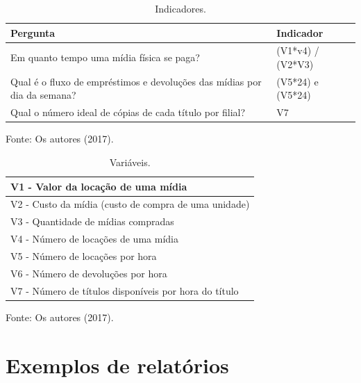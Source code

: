 \begin{table}[!htb]
    \begin{center}
        \caption{Indicadores.} \label{tab:indi}
        \begin{tabular}{ p{4.5cm} |  p{4.5cm}   }
            \hline
            \textbf{Pergunta} & \textbf{Indicador}   \\
            \hline
            Em quanto tempo uma mídia física se paga? & (V1*v4) / (V2*V3) \\
            \hline
            Qual é o fluxo de empréstimos e devoluções das mídias por dia da semana? & (V5*24) e (V5*24)  \\
            \hline
           Qual o número ideal de cópias de cada título por filial? & V7 \\
            \hline

        \end{tabular}
    \end{center}
    Fonte: Os autores (2017).
\end{table}


\begin{table}[!htb]
    \begin{center}
        \caption{Variáveis.} \label{tab:variaveis}
        \begin{tabular}{ p{8cm}    }
            \hline
              V1 - Valor da locação de uma mídia \\
            \hline
              V2 - Custo da mídia (custo de compra de uma unidade) \\
            \hline
            V3 - Quantidade de mídias compradas   \\
            \hline
           V4 - Número de locações de uma mídia \\
            \hline
             V5 - Número de locações por hora \\
            \hline
             V6 - Número de devoluções por hora \\
            \hline
            V7 - Número de títulos disponíveis por hora do título \\
        \hline
        \end{tabular}
    \end{center}
    Fonte: Os autores (2017).
\end{table}

\section{Exemplos de relatórios}

